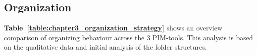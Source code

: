 




\subsection{Organization}
\label{exp-study:comparison-organization}
\textbf{Table~\ref{table:chapter3_organization_strategy}} shows an overview comparison of organizing behaviour across the 3 PIM-tools. This analysis is based on the qualitative data and initial analysis of the folder structures.

